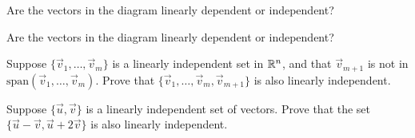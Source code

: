 \documentclass{ximera}
\begin{document}
\begin{problem}\label{prob:linindmultchoice9}
Are the vectors in the diagram linearly dependent or independent?
\begin{multipleChoice}
 \end{multipleChoice}
\begin{center}
\end{center}
\end{problem}

\begin{problem}\label{prob:linindmultchoice10}
Are the vectors in the diagram linearly dependent or independent?
\begin{multipleChoice}
 \end{multipleChoice}
\begin{center}
\end{center}
\end{problem}


\begin{problem}\label{prob:Adding1OK}
Suppose $\{\vec{v}_{1}, \dots , \vec{v}_{m}\}$ is a linearly independent set in $\mathbb{R}^n$, and that $\vec{v}_{m+1}$ is not in $\mbox{span}\left(\vec{v}_{1}, \dots , \vec{v}_{m}\right)$.  Prove that $\{\vec{v}_{1}, \dots , \vec{v}_{m}, \vec{v}_{m+1}\}$ is also linearly independent.
\end{problem}

\begin{problem}\label{prob:OtherLinearComb}
Suppose $\{{\vec{u}},{\vec{v}}\}$ is a linearly independent set of vectors.  Prove that the set $\{\vec{u} -\vec{v}, \vec{u}+2\vec{v}\}$ is also linearly independent.
\end{problem}
\end{document}
